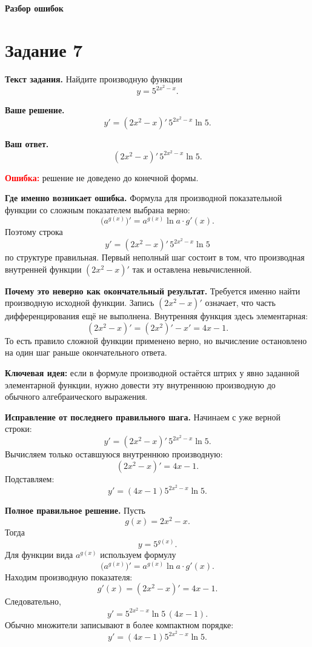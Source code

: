 \documentclass[12pt,a4paper]{article}
\begin{document}
\newpage
\null\vfill
\begin{center}
{\LARGE\bfseries Разбор ошибок}
\end{center}
\vfill\null

\newpage
{}\label{task:7}
\section*{Задание 7}

\textbf{Текст задания.}
Найдите производную функции
\[
y=5^{2x^2-x}.
\]

\textbf{Ваше решение.}
\[
y'=(2x^2-x)'\,5^{2x^2-x}\ln 5.
\]

\textbf{Ваш ответ.}
\[
(2x^2-x)'\,5^{2x^2-x}\ln 5.
\]

\textcolor{red}{\textbf{Ошибка:}} решение не доведено до конечной формы.

\textbf{Где именно возникает ошибка.}
Формула для производной показательной функции со сложным показателем выбрана верно:
\[
\bigl(a^{g(x)}\bigr)'=a^{g(x)}\ln a\cdot g'(x).
\]
Поэтому строка
\[
y'=(2x^2-x)'\,5^{2x^2-x}\ln 5
\]
по структуре правильная. Первый неполный шаг состоит в том, что производная внутренней функции $(2x^2-x)'$ так и оставлена невычисленной.

\textbf{Почему это неверно как окончательный результат.}
Требуется именно найти производную исходной функции. Запись $(2x^2-x)'$ означает, что часть дифференцирования ещё не выполнена. Внутренняя функция здесь элементарная:
\[
(2x^2-x)'=(2x^2)'-x'=4x-1.
\]
То есть правило сложной функции применено верно, но вычисление остановлено на один шаг раньше окончательного ответа.

\textcolor{blue!60!black}{\textbf{Ключевая идея:}}
если в формуле производной остаётся штрих у явно заданной элементарной функции, нужно довести эту внутреннюю производную до обычного алгебраического выражения.

\textbf{Исправление от последнего правильного шага.}
Начинаем с уже верной строки:
\[
y'=(2x^2-x)'\,5^{2x^2-x}\ln 5.
\]
Вычисляем только оставшуюся внутреннюю производную:
\[
(2x^2-x)'=4x-1.
\]
Подставляем:
\[
y'=(4x-1)5^{2x^2-x}\ln 5.
\]

\textbf{Полное правильное решение.}
Пусть
\[
g(x)=2x^2-x.
\]
Тогда
\[
y=5^{g(x)}.
\]
Для функции вида $a^{g(x)}$ используем формулу
\[
\bigl(a^{g(x)}\bigr)'=a^{g(x)}\ln a\cdot g'(x).
\]
Находим производную показателя:
\[
g'(x)=(2x^2-x)'=4x-1.
\]
Следовательно,
\[
y'=5^{2x^2-x}\ln 5\,(4x-1).
\]
Обычно множители записывают в более компактном порядке:
\[
\boxed{y'=(4x-1)5^{2x^2-x}\ln 5}.
\]
\end{document}
